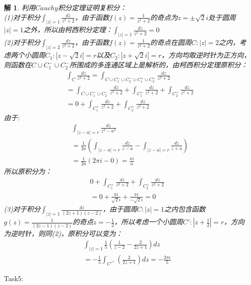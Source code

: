 \documentclass{ctexart}
\newcommand{\。}{．} %
\newenvironment{lanse}{
    \begin{tcolorbox}[breakable,enhanced, colback=qlan, boxrule=0pt, frame hidden,
        borderline west={0.7mm}{0.1mm}{slan}]
    }
    {\end{tcolorbox}}
\theoremstyle{t} %
\newtheorem*{tmhj}{\color{slan} 解}
\newenvironment{tm}{\begin{lanse}\begin{tmhj}}{\end{tmhj}\end{lanse}}
\begin{document}
\begin{tm}
    利用$Cauchy$积分定理证明复积分：\\
(1)对于积分$\int_{|z|=1}^{}\frac{dz}{z^2+2}$，由于函数$f(z)=\frac{1}{z^2+2}$的奇点为$z=\pm \sqrt{2}i$处于圆周$|z|=1$之外，所以由柯西积分定理：$\int_{|z|=1}^{}\frac{dz}{z^2+2}=0$\\
(2)对于积分$\int_{|z|=2}^{}\frac{dz}{z^2+2}$，由于函数$f(z)=\frac{1}{z^2+2}$的奇点在圆周$C:|z|=2$之内，考虑两个小圆周$C_1:|z-\sqrt{2}i|=r$以及$C_2:|z+\sqrt{2}i|=r$，方向均取逆时针为正方向，则函数在$C\cup C_1^-\cup C_2^-$所围成的多连通区域上是解析的，由柯西积分定理原积分：
\begin{align*}
    &\int_{C}^{}\frac{dz}{z^2+2}=\int_{C\cup C_1^-\cup C_2^-\cup C_1^+\cup C_2^+}^{}\frac{dz}{z^2+2}\\
    &=\int_{C\cup C_1^-\cup C_2^-}^{}\frac{dz}{z^2+2}+\int_{C_1^+}^{}\frac{dz}{z^2+2}+\int_{C_2^+}^{}\frac{dz}{z^2+2}\\
    &=0+\int_{C_1^+}^{}\frac{dz}{z^2+2}+\int_{C_2^+}^{}\frac{dz}{z^2+2}
\end{align*}
由于:
\begin{align*}
    &\int_{|z-a|=r}^{}\frac{dz}{z^2-a^2}\\
    &=\frac{1}{2a}\left(\int_{|z-a|=r}^{}\frac{dz}{z-a}-\int_{|z-a|=r}^{}\frac{dz}{z+a}\right)\\
    &=\frac{1}{2a}\left(2\pi i-0\right)=\frac{\pi i}{a}
\end{align*}
所以原积分为：
\begin{align*}
    0+\int_{C_1^+}^{}\frac{dz}{z^2+2}+\int_{C_2^+}^{}\frac{dz}{z^2+2}\\
    =0+\frac{\pi i}{\sqrt{2}i}+\frac{\pi i}{-\sqrt{2}i}=0
\end{align*}
(3)对于积分$\int_{|z|=1}^{}\frac{dz}{(2z+1)(z-2)}$，由于圆周$C:|z|=1$之内包含函数$g(z)=\frac{1}{(2z-1)(z-2)}$的奇点$z=-\frac{1}{2}$，所以考虑一个小圆周$C':|z+\frac{1}{2}|=r$，方向为逆时针，则同(2)，原积分可以变为：
\begin{align*}
    \int_{|z|=1}^{}\frac{1}{5}\left(\frac{1}{z-2}-\frac{2}{2z+1}\right)dz\\
    =-\frac{1}{5}\int_{C'^+}^{}\left(\frac{2}{2z+1}\right)dz=-\frac{2\pi i}{5}
\end{align*}
\end{tm}
Task5:
\end{document}
